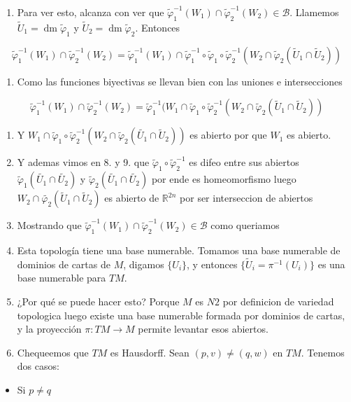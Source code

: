 \begin{bookproof}{}
\begin{enumerate}[start=13]
\item Para ver esto, alcanza con ver que $\tilde{\varphi}_1^{-1}(W_1)\cap \tilde{\varphi}_2^{-1}(W_2)\in \mathcal{B}$. Llamemos $\tilde{U}_1=\operatorname{dm}\tilde{\varphi}_1$ y $\tilde{U}_2=\operatorname{dm}\tilde{\varphi}_2$. Entonces
\end{enumerate}
\[
\tilde{\varphi}_1^{-1}(W_1)\cap \tilde{\varphi}_2^{-1}(W_2)=\tilde{\varphi}_1^{-1}(W_1)\cap \tilde{\varphi}_{1}^{-1}\circ\tilde{\varphi}_1\circ \tilde{\varphi}_{2}^{-1}(W_{2}\cap \tilde{\varphi}_2(\tilde{U}_{1}\cap \tilde{U}_{2}))
\]
\begin{enumerate}[start=17]
\item Como las funciones biyectivas se llevan bien con las uniones e intersecciones
\end{enumerate}
\[
\tilde{\varphi}_1^{-1}(W_1)\cap \tilde{\varphi}_2^{-1}(W_2)=\tilde{\varphi}_1^{-1}(W_1\cap \tilde{\varphi}_{1}\circ \tilde{\varphi}_{2}^{-1}(W_{2}\cap \tilde{\varphi}_2(\tilde{U}_{1}\cap \tilde{U}_{2}))
\]
\begin{enumerate}[start=18]
\item Y $W_{1}\cap \tilde{\varphi}_{1}\circ \tilde{\varphi}_{2}^{-1}(W_{2}\cap \tilde{\varphi}_{2}(\tilde{U_{1}}\cap \tilde{U}_{2}))$ es abierto por que $W_{1}$ es abierto.
\item Y ademas vimos en 8. y 9. que $\tilde{\varphi}_{1}\circ\tilde{\varphi}_{2}^{-1}$ es difeo entre sus abiertos $\tilde{\varphi}_{1}(\tilde{U_{1}}\cap \tilde{U_{2}})$ y $\tilde{\varphi}_{2}(\tilde{U_{1}}\cap \tilde{U_{2}})$ por ende es homeomorfismo luego $W_{2}\cap \tilde{\varphi_{2}}(\tilde{U}_{1}\cap \tilde{U}_{2})$ es abierto de $\mathbb{R}^{2n}$ por ser interseccion de abiertos
\item Mostrando que $\tilde{\varphi}_1^{-1}(W_1)\cap \tilde{\varphi}_2^{-1}(W_2)\in \mathcal{B}$ como queriamos
\item Esta topología tiene una base numerable. Tomamos una base numerable de dominios de cartas de $M$, digamos $\{U_i\}$, y entonces $\{\tilde{U}_i=\pi^{-1}(U_i)\}$ es una base numerable para $TM$.
\item ¿Por qué se puede hacer esto? Porque $M$ es $N2$ por definicion de variedad topologica luego existe una base numerable formada por dominios de cartas, y la proyección $\pi:TM\to M$ permite levantar esos abiertos.
\item Chequeemos que $TM$ es Hausdorff. Sean $(p,v)\neq(q,w)$ en $TM$. Tenemos dos casos:
\end{enumerate}
\begin{itemize}
\item Si $p\neq q$


\end{itemize}
\end{bookproof}
